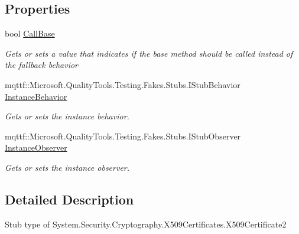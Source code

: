 \subsection*{Properties}
\begin{DoxyCompactItemize}
\item 
bool \hyperlink{class_system_1_1_security_1_1_cryptography_1_1_x509_certificates_1_1_fakes_1_1_stub_x509_certificate2_a6111813a77e320dffa2b664c130a5c5d}{Call\-Base}
\begin{DoxyCompactList}\small\item\em Gets or sets a value that indicates if the base method should be called instead of the fallback behavior\end{DoxyCompactList}\item 
mqttf\-::\-Microsoft.\-Quality\-Tools.\-Testing.\-Fakes.\-Stubs.\-I\-Stub\-Behavior \hyperlink{class_system_1_1_security_1_1_cryptography_1_1_x509_certificates_1_1_fakes_1_1_stub_x509_certificate2_a845f50abecbae25364a8596f2c314462}{Instance\-Behavior}
\begin{DoxyCompactList}\small\item\em Gets or sets the instance behavior.\end{DoxyCompactList}\item 
mqttf\-::\-Microsoft.\-Quality\-Tools.\-Testing.\-Fakes.\-Stubs.\-I\-Stub\-Observer \hyperlink{class_system_1_1_security_1_1_cryptography_1_1_x509_certificates_1_1_fakes_1_1_stub_x509_certificate2_ae8048f9a80283588df6f8d768dc76f4c}{Instance\-Observer}
\begin{DoxyCompactList}\small\item\em Gets or sets the instance observer.\end{DoxyCompactList}\end{DoxyCompactItemize}


\subsection{Detailed Description}
Stub type of System.\-Security.\-Cryptography.\-X509\-Certificates.\-X509\-Certificate2



